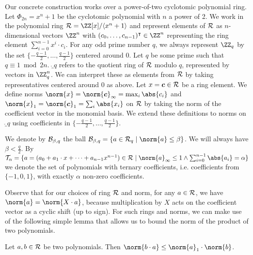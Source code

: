 
Our concrete construction works over a power-of-two cyclotomic polynomial ring.
Let $\Phi_{2n} = x^n+1$ be the cyclotomic polynomial with $n$ a power of 2. 
We work in the polynomial ring $\ring =  \ZZ[x]/\langle x^n+1\rangle$ and represent elements of $\mathcal{R}$ as $n$-dimensional vectors $\ZZ^n$ with $(c_0,\dots,c_{n-1})^\transpose\in \ZZ^n$ representing the ring element $\sum_{i=0}^{n-1} x^i \cdot c_i$.
For any odd prime number $q$, we always represent $\ZZ_q$ by the set $\{-\tfrac{q-1}{2},\ldots,\tfrac{q-1}{2}\}$ centered around 0.
Let $q$  be some prime such that $q \equiv 1 \bmod 2n$.
$\ring_q$ refers to the quotient ring of $\mathcal{R}$ modulo $q$, represented by vectors in $\ZZ_q^n$. We can interpret these as elements from $\mathcal{R}$ by taking representatives centered around 0 as above.
Let $x = \boldsymbol{c} \in \mathcal{R}$ be a ring element.
We define norms $\norm{x} = \norm{\vec{c}}_\infty = \max_{i}\abs{c_i}$ and $\norm{x}_1 = \norm{\vec{c}}_1 = \sum_{i}\abs{x_i}$ on $\mathcal{R}$ by taking the norm of the coefficient vector in the monomial basis.
We extend these definitions to norms on $\ring_q$ using coefficients in $\{-\tfrac{q-1}{2},\ldots,\tfrac{q-1}{2}\}$.

We denote by $\mathcal{B}_{\beta, q}$ the ball $\ball{\beta}{q} = \{a\in\ring_q\mid \norm{a}\leq\beta\}$. We will always have $\beta < \tfrac{q}{2}$. By 
$\tern_\alpha = \{a=(a_0+a_1\cdot x + \dots + a_{n-1}x^{n-1}) \in\ring \mid \norm{a}_\infty\leq 1 \land \sum_{i=0}^{n-1} \abs{a_i} = \alpha\}$ %
we denote the set of polynomials with ternary coefficients, i.e. coefficients from $\{-1,0,1\}$, with exactly $\alpha$ non-zero coefficients.


Observe that for our choices of ring $\mathcal{R}$ and norm, for any $a\in\mathcal{R}$, we have $\norm{a} = \norm{X\cdot a}$, because multiplication by $X$ acts on the coefficient vector as a cyclic shift (up to sign).
For such rings and norms, we can make use of the following simple lemma that allows us to bound the norm of the product of two polynomials.
\begin{lemma}\label{lem:ternbound}
  Let $a,b\in\mathcal{R}$ be two polynomials. Then $\norm{b\cdot a} \leq \norm{a}_1\cdot\norm{b}$.
\end{lemma}

